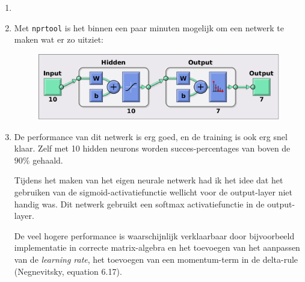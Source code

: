 \documentclass[a4paper,10pt,fleqn]{article}
\begin{document}
\begin{enumerate}[1.]
	\item

	\item Met \verb|nprtool| is het binnen een paar minuten mogelijk om een netwerk te maken wat er zo uitziet:

	\begin{figure}[!h]
		\centering
		\includegraphics[width=.8\textwidth]{nprtool-diagram}
	\end{figure}

	\item De performance van dit netwerk is erg goed, en de training is ook erg snel klaar. Zelf met 10 hidden neurons worden succes-percentages van boven de $90\%$ gehaald.

	Tijdens het maken van het eigen neurale netwerk had ik het idee dat het gebruiken van de sigmoid-activatiefunctie wellicht voor de output-layer niet handig was. Dit netwerk gebruikt een softmax activatiefunctie in de output-layer.

	De veel hogere performance is waarschijnlijk verklaarbaar door bijvoorbeeld implementatie in correcte matrix-algebra en het toevoegen van het aanpassen van de \textit{learning rate}, het toevoegen van een momentum-term in de delta-rule (Negnevitsky, equation 6.17).
\end{enumerate}
\end{document}
